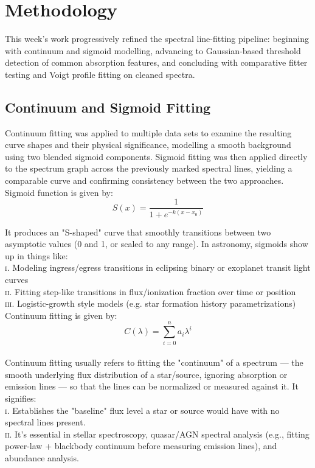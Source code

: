 \documentclass[12pt]{article}
\begin{document}
\section{Methodology}
\label{sec:methodology}
 
This week's work progressively refined the spectral line-fitting pipeline: beginning with continuum and sigmoid modelling, advancing to Gaussian-based threshold detection of common absorption features, and concluding with comparative fitter testing and Voigt profile fitting on cleaned spectra.
 
\subsection{Continuum and Sigmoid Fitting}
 
Continuum fitting was applied to multiple data sets to examine the resulting curve shapes and their physical significance, modelling a smooth background using two blended sigmoid components. Sigmoid fitting was then applied directly to the spectrum graph across the previously marked spectral lines, yielding a comparable curve and confirming consistency between the two approaches.
Sigmoid function is given by:
\begin{equation}
S(x)=\frac{1}{1+e^{-k(x-x_0)}}
\end{equation}

It produces an "S-shaped" curve that smoothly transitions between two asymptotic values (0 and 1, or scaled to any range). In astronomy, sigmoids show up in things like:\\
\textsc{i}. Modeling ingress/egress transitions in eclipsing binary or exoplanet transit light curves\\
\textsc{ii}. Fitting step-like transitions in flux/ionization fraction over time or position\\
\textsc{iii}. Logistic-growth style models (e.g. star formation history parametrizations)\\

Continuum fitting is given by:
\begin{equation}
C(\lambda) = \sum_{i=0}^{n} a_i \lambda^i
\end{equation} 
\\

Continuum fitting usually refers to fitting the "continuum" of a spectrum — the smooth underlying flux distribution of a star/source, ignoring absorption or emission lines — so that the lines can be normalized or measured against it. It signifies:\\
\textsc{i}. Establishes the "baseline" flux level a star or source would have with no spectral lines present.\\
\textsc{ii}. It's essential in stellar spectroscopy, quasar/AGN spectral analysis (e.g., fitting power-law + blackbody continuum before measuring emission lines), and abundance analysis.\\
 
\end{document}
